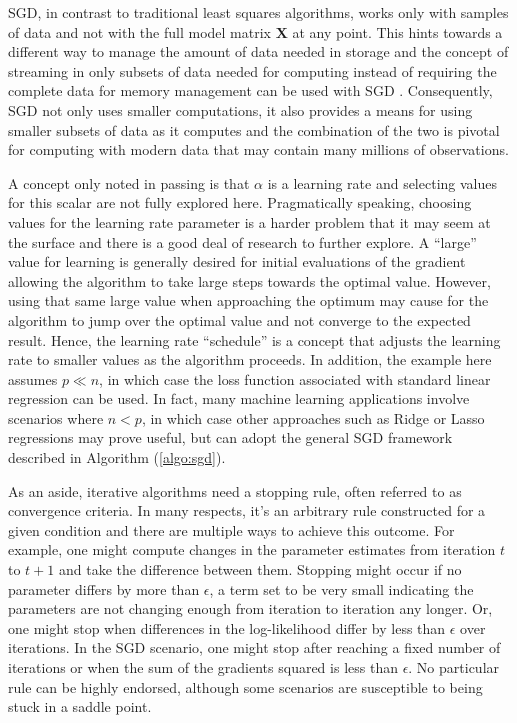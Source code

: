 \documentclass[12pt]{article}
\begin{document}
SGD, in contrast to traditional least squares algorithms, works only with samples of data and not with the full model matrix $\bm{X}$ at any point. This hints towards a different way to manage the amount of data needed in storage and the concept of streaming in only subsets of data needed for computing instead of requiring the complete data for memory management can be used with SGD \cite{tran}. Consequently, SGD not only uses smaller computations, it also provides a means for using smaller subsets of data as it computes and the combination of the two is pivotal for computing with modern data that may contain many millions of observations. 

A concept only noted in passing is that $\alpha$ is a learning rate and selecting values for this scalar are not fully explored here. Pragmatically speaking, choosing values for the learning rate parameter is a harder problem that it may seem at the surface and there is a good deal of research to further explore. A ``large'' value for learning is generally desired for initial evaluations of the gradient allowing the algorithm to take large steps towards the optimal value. However, using that same large value when approaching the optimum may cause for the algorithm to jump over the optimal value and not converge to the expected result. Hence, the learning rate ``schedule'' is a concept that adjusts the learning rate to smaller values as the algorithm proceeds. In addition, the example here assumes $p \ll n$, in which case the loss function associated with standard linear regression can be used. In fact, many machine learning applications involve scenarios where $n < p$, in which case other approaches such as Ridge or Lasso regressions may prove useful, but can adopt the general SGD framework described in Algorithm (\ref{algo:sgd}). 

As an aside, iterative algorithms need a stopping rule, often referred to as convergence criteria. In many respects, it's an arbitrary rule constructed for a given condition and there are multiple ways to achieve this outcome. For example, one might compute changes in the parameter estimates from iteration $t$ to $t+1$ and take the difference between them. Stopping might occur if no parameter differs by more than $\epsilon$, a term set to be very small indicating the parameters are not changing enough from iteration to iteration any longer. Or, one might stop when differences in the log-likelihood differ by less than $\epsilon$ over iterations. In the SGD scenario, one might stop after reaching a fixed number of iterations or when the sum of the gradients squared is less than $\epsilon$. No particular rule can be highly endorsed, although some scenarios are susceptible to being stuck in a saddle point. 
\end{document}

